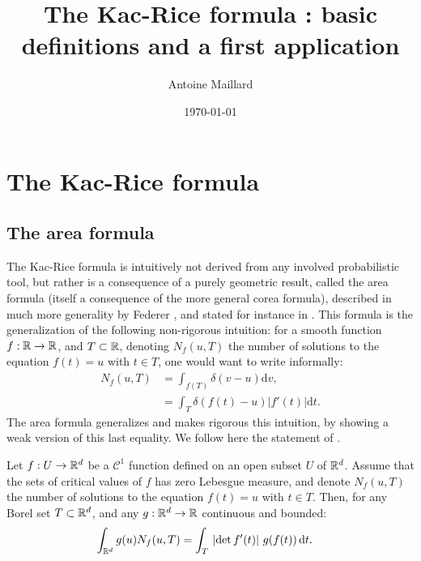 \documentclass[amsmath,amssymb,nofootinbib,prd]{article}
\begin{document}
\title{The Kac-Rice formula : basic definitions and a first application}
\date{\today}
\author{Antoine Maillard}
\maketitle
%
\renewcommand{\labelitemi}{$\bullet$}


\section{The Kac-Rice formula}

\subsection{The area formula}
	The Kac-Rice formula is intuitively not derived from any involved probabilistic tool, but rather is a consequence of a purely geometric result, called the area formula (itself a consequence of the more general corea formula), described in much more generality by Federer \cite{federer1959curvature}, and stated for instance in \cite{azais2009level}. This formula is the generalization of the following non-rigorous intuition: for a smooth function $f : \mathbb{R} \to \mathbb{R}$, and $T \subset \mathbb{R}$, denoting $N_f(u,T)$ the number of solutions to the equation $f(t) = u$ with $t \in T$, one would want to write informally:
	\begin{align}
	N_f(u,T) &= \int_{f(T)} \delta\left(v - u\right) \mathrm{d}v, \\
	  &= \int_T \delta\left(f(t) - u\right) |f'(t)| \mathrm{d}t.
	\end{align}
	The area formula generalizes and makes rigorous this intuition, by showing a weak version of this last equality. We follow here the statement of \cite{azais2009level}. 
	\begin{proposition}\label{prop:area}
	Let $f : U \to \mathbb{R}^d$ be a $\mathcal{C}^1$ function defined on an open subset $U$ of $\mathbb{R}^d$. Assume that the sets of critical values of $f$ has zero Lebesgue measure, and denote $N_f(u,T)$  the number of solutions to the equation $f(t) = u$ with $t \in T$. Then, for any Borel set $T \subset \mathbb{R}^d$, and any $g : \mathbb{R}^d \to \mathbb{R}$ continuous and bounded:
	\begin{align}
\int_{\mathbb{R}^d} g(u) N_f(u,T) &= \int_T \, \left|\det f'(t)\right| \, g(f(t)) \,\mathrm{d}t. 	
	\end{align}
	\end{proposition}
	
\end{document}
